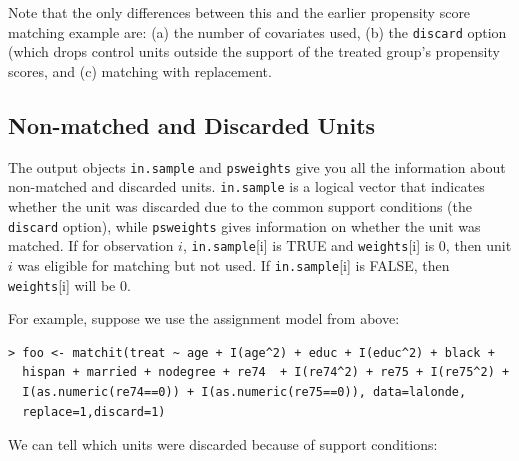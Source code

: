 \documentclass[oneside,letterpaper,titlepage]{article}
\begin{document}
Note that the only differences between this and the earlier propensity
score matching example are: (a) the number of covariates used,  (b)
the \texttt{discard} option (which drops control units outside
the support of the treated group's propensity scores, and (c) matching with replacement. 

\subsection{Non-matched and Discarded Units}
The output objects \texttt{in.sample} and \texttt{psweights} give you all the
information about non-matched and discarded units.  \texttt{in.sample}
is a logical vector that indicates whether the unit was discarded due
to the common support conditions (the \texttt{discard} option), while
\texttt{psweights} gives information on whether the unit was matched.
If for observation $i$, \texttt{in.sample}[i] is TRUE and
\texttt{weights}[i] is $0$, then unit $i$ was eligible for matching
but not used.  If \texttt{in.sample}[i] is FALSE, then
\texttt{weights}[i] will be $0$.  

For example, suppose we use the assignment model from above:

\begin{verbatim}
> foo <- matchit(treat ~ age + I(age^2) + educ + I(educ^2) + black +
  hispan + married + nodegree + re74  + I(re74^2) + re75 + I(re75^2) +
  I(as.numeric(re74==0)) + I(as.numeric(re75==0)), data=lalonde,
  replace=1,discard=1)
\end{verbatim}

We can tell which units were discarded because of support conditions:
\end{document}
